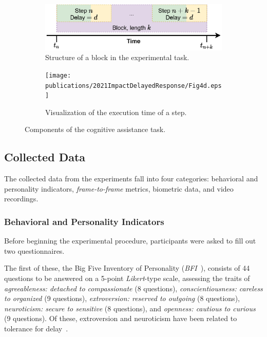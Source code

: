 \begin{figure}[h]
\begin{subfigure}[t]{.49\textwidth}
  \end{subfigure}
  \medskip%
  \begin{subfigure}[t]{.49\textwidth}
    \centering
    \includegraphics[width=\textwidth]{publications/2021ImpactDelayedResponse/Fig4c.eps}
    \caption{Structure of a block in the experimental task.}%
    \label{fig:cogassist:block}
  \end{subfigure}%
  \hfill%
  \begin{subfigure}[t]{.49\textwidth}
    \centering
    \texttt{[image: publications/2021ImpactDelayedResponse/Fig4d.eps]}
    \caption{Visualization of the execution time of a step.}%
    \label{fig:exectime:diagram}
  \end{subfigure}%
  \caption{Components of the cognitive assistance task.}
\end{figure}

\subsection{Collected Data}

The collected data from the experiments fall into four categories: behavioral and personality indicators, \emph{frame-to-frame} metrics, biometric data, and video recordings.

\subsubsection{Behavioral and Personality Indicators}

Before beginning the experimental procedure, participants were asked to fill out two questionnaires.

The first of these, the Big Five Inventory of Personality (\emph{BFI}~\cite{john1999:bfi}), consists of 44 questions to be answered on a 5-point \emph{Likert}-type scale, assessing the traits of \emph{agreeableness: detached to compassionate} (8 questions), \emph{conscientiousness: careless to organized} (9 questions), \emph{extroversion: reserved to outgoing} (8 questions), \emph{neuroticism: secure to sensitive} (8 questions), and \emph{openness: cautious to curious} (9 questions).
Of these, extroversion and neuroticism have been related to tolerance for delay~\cite{hirsh2008delay}. 

